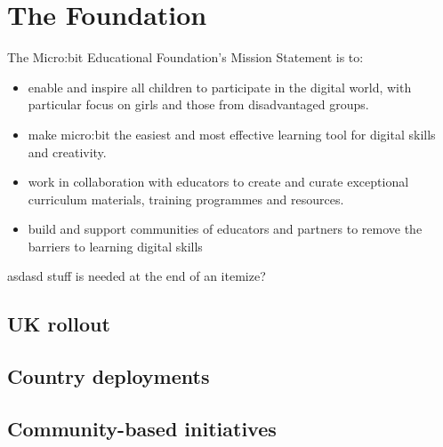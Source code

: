 \section{The Foundation}
\label{sec:mef}

The Micro:bit Educational Foundation's Mission Statement is to:
\begin{itemize}
\item  enable and inspire all children to participate in the digital world,
with particular focus on girls and those from disadvantaged groups.
\item make micro:bit the easiest and most effective learning tool for digital skills and creativity.
\item work in collaboration with educators to create and curate exceptional
curriculum materials, training programmes and resources.
\item build and support communities of educators and partners
to remove the barriers to learning digital skills
\end{itemize}

asdasd stuff is needed at the end of an itemize?

%


\subsection{UK rollout}


\subsection{Country deployments}


\subsection{Community-based initiatives}



